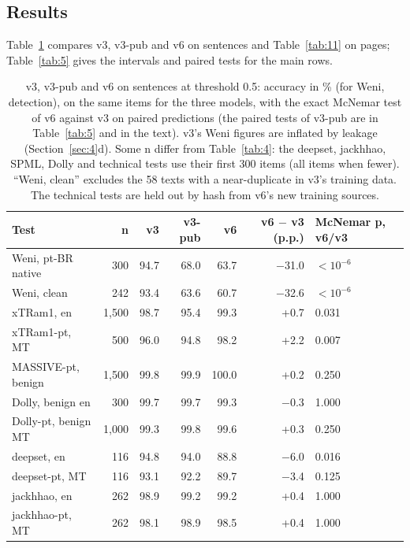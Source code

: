 \documentclass[11pt]{article}
\begin{document}
\subsection{Results}\label{sec:7.2}

Table~\ref{tab:10} compares v3, v3-pub and v6 on sentences and Table~\ref{tab:11} on pages; Table~\ref{tab:5} gives the intervals and paired tests for the main rows.

\begin{table}[tbp]
\centering
\small
\caption{v3, v3-pub and v6 on sentences at threshold 0.5: accuracy in \% (for Weni, detection), on the same items for the three models, with the exact McNemar test of v6 against v3 on paired predictions (the paired tests of v3-pub are in Table~\ref{tab:5} and in the text). v3's Weni figures are inflated by leakage (Section~\ref{sec:4}d). Some n differ from Table~\ref{tab:4}: the deepset, jackhhao, SPML, Dolly and technical tests use their first 300 items (all items when fewer). ``Weni, clean'' excludes the 58 texts with a near-duplicate in v3's training data. The technical tests are held out by hash from v6's new training sources.}\label{tab:10}
\begin{tabularx}{\linewidth}{@{}>{\raggedright\arraybackslash\hsize=1.00\hsize}Xrrrrrl@{}}
\toprule
Test & n & v3 & v3-pub & v6 & v6 \ensuremath{-} v3 (p.p.) & McNemar p, v6/v3 \\
\midrule
Weni, pt-BR native & 300 & 94.7 & 68.0 & 63.7 & \ensuremath{-}31.0 & $<10^{-6}$ \\
Weni, clean & 242 & 93.4 & 63.6 & 60.7 & \ensuremath{-}32.6 & $<10^{-6}$ %
 \\
xTRam1, en & 1,500 & 98.7 & 95.4 & 99.3 & +0.7 & 0.031 \\
xTRam1-pt, MT & 500 & 96.0 & 94.8 & 98.2 & +2.2 & 0.007 \\
MASSIVE-pt, benign & 1,500 & 99.8 & 99.9 & 100.0 & +0.2 & 0.250 \\
Dolly, benign en & 300 & 99.7 & 99.7 & 99.3 & \ensuremath{-}0.3 & 1.000 \\
Dolly-pt, benign MT & 1,000 & 99.3 & 99.8 & 99.6 & +0.3 & 0.250 \\
deepset, en & 116 & 94.8 & 94.0 & 88.8 & \ensuremath{-}6.0 & 0.016 \\
deepset-pt, MT & 116 & 93.1 & 92.2 & 89.7 & \ensuremath{-}3.4 & 0.125 \\
jackhhao, en & 262 & 98.9 & 99.2 & 99.2 & +0.4 & 1.000 \\
jackhhao-pt, MT & 262 & 98.1 & 98.9 & 98.5 & +0.4 & 1.000 \\

\end{tabularx}
\end{table}
\end{document}
